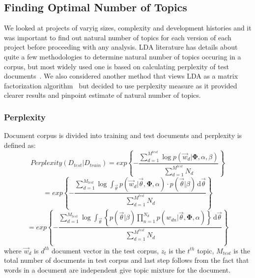 \documentclass[12pt]{article}
\begin{document}
\subsection{Finding Optimal Number of Topics}\label{Optimal Number of Topics}
We looked at projects of varyig sizes, complexity and development histories and it was important to find out natural number of topics for each version of each project before proceeding with any analysis. LDA literature has details about quite a few methodologies to determine natural number of topics occuring in a corpus, but most widely used one is based on calculating perplexity of test documents~\cite{Blei:2003:LDA:944919.944937}. We also considered another method that views LDA as a matrix factorization algorithm~\cite{arun2010finding} but decided to use perplexity measure as it provided clearer results and pinpoint estimate of natural number of topics.

\subsubsection{Perplexity} \label{Perplexity}
Document corpus is divided into training and test documents and perplexity is defined as:
\begin{equation*}
Perplexity(D_{test}|D_{train}) = exp\left\{-\frac{\sum_{d=1}^{M^{test}} \log p(\vec w_{d}|\mathbf{\Phi}, \alpha, \beta)}{\sum_{d=1}^{M^{test}} N_d}\right\}
\end{equation*}
\begin{equation*}
 = exp\left\{-\frac{\sum_{d=1}^{M_{test}} \log \int_{\vec\theta} p(\vec w_d|\vec\theta, \mathbf{\Phi}, \alpha)\cdot p(\vec{\theta}|\beta)\,\mathrm{d}\vec\theta}{\sum_{d=1}^{M^{test}} N_d}\right\}
\end{equation*}
\begin{equation*}
 = exp\left\{-\frac{\sum_{d=1}^{M_{test}} \log \int_{\vec\theta} \left\{p(\vec{\theta}|\beta)\prod_{n=1}^{N_d}p(w_{dn}|\vec\theta, \mathbf{\Phi}, \alpha)\right\}\,\mathrm{d}\vec\theta}{\sum_{d=1}^{M^{test}} N_d}\right\}
\end{equation*}
where $\vec w_d$ is $d^{th}$ document vector in the test corpus, $z_t$ is the $t^{th}$ topic, $M_{test}$ is the total number of documents in test corpus and last step follows from the fact that words in a document are independent give topic mixture for the document.\\
\end{document}
